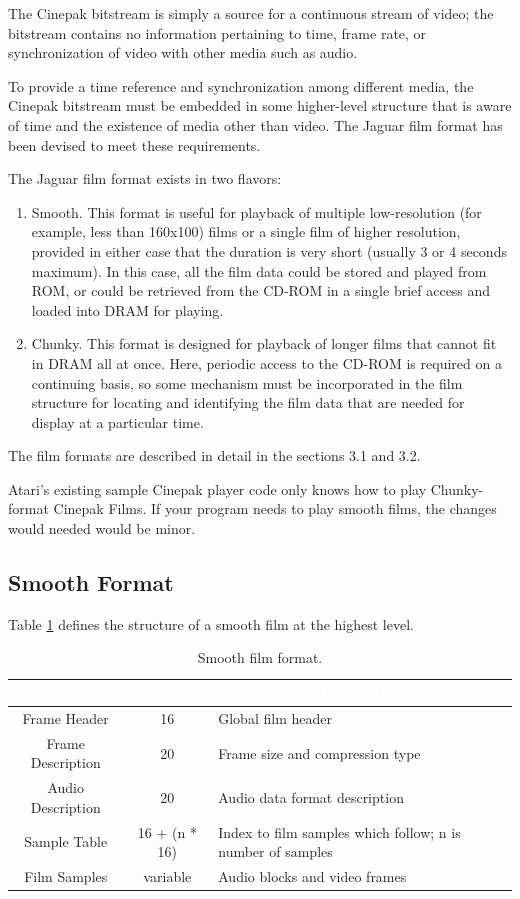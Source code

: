 \documentclass[12pt,letterpaper,twoside]{article}
\newcommand{\tabheadtxt}[1]{\multicolumn{1}{c}{\textcolor{white}{\textbf{#1}}}}
\begin{document}
The Cinepak bitstream is simply a source for a continuous stream of video; the bitstream contains no information pertaining to time, frame rate, or synchronization of video with other media such as audio. 

To provide a time reference and synchronization among different media, the Cinepak bitstream must be embedded in some higher-level structure that is aware of time and the existence of media other than video. The Jaguar film format has been devised to meet these requirements. 

The Jaguar film format exists in two flavors: 

\begin{enumerate}[1), left=0pt .. 36pt]
\item Smooth. This format is useful for playback of multiple low-resolution (for example, less than 160x100) films or a single film of higher resolution, provided in either case that the duration is very short (usually 3 or 4 seconds maximum). In this case, all the film data could be stored and played from ROM, or could be retrieved from the CD-ROM in a single brief access and loaded into DRAM for playing.
\item Chunky. This format is designed for playback of longer films that cannot fit in DRAM all at once. Here, periodic access to the CD-ROM is required on a continuing basis, so some mechanism must be incorporated in the film structure for locating and identifying the film data that are needed for display at a particular time.
\end{enumerate}

The film formats are described in detail in the sections 3.1 and 3.2.

Atari's existing sample Cinepak player code only knows how to play Chunky-format Cinepak Films. If your program needs to play smooth films, the changes would needed would be minor. 

\subsection{Smooth Format}

Table \ref{tab:smoothfmt} defines the structure of a smooth film at the highest level. 

\begin{table}[h]
\centering
\begin{tabular}{|c|c|p{10cm}|}
\hline
\rowcolor{black}
\tabheadtxt{Field} & \tabheadtxt{Size} & \tabheadtxt{Description} \\
\hline
Frame Header & 16 & Global film header\\
\hline
Frame Description & 20 & Frame size and compression type\\
\hline
Audio Description & 20 & Audio data format description\\
\hline
Sample Table & 16 + (n * 16) & Index to film samples which follow; n is number of samples\\
\hline
Film Samples & variable & Audio blocks and video frames\\
\hline
\end{tabular}
\caption{Smooth film format.}
\label{tab:smoothfmt}
\end{table}
\FloatBarrier
\end{document}
